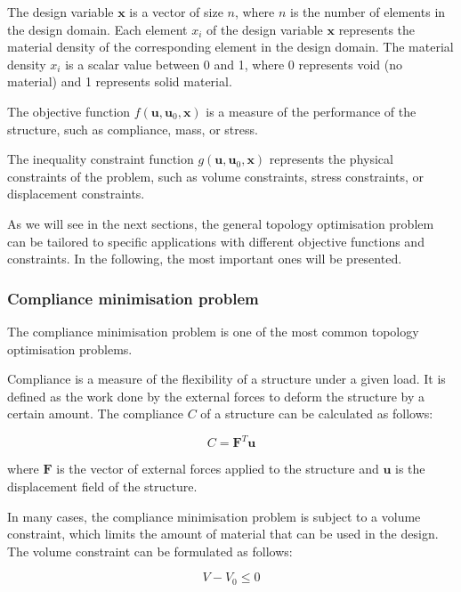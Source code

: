 The design variable $\bm{x}$ is a vector of size $n$, where $n$ is the number of elements in the design domain.
Each element $x_i$ of the design variable $\bm{x}$ represents the material density of the corresponding element in the design domain.
The material density $x_i$ is a scalar value between 0 and 1, where 0 represents void (no material) and 1 represents solid material.

The objective function $f(\bm{u}, \bm{u}_0, \bm{x})$ is a measure of the performance of the structure, such as compliance, mass, or stress.

The inequality constraint function $g(\bm{u}, \bm{u}_0, \bm{x})$ represents the physical constraints of the problem, such as volume constraints, stress constraints, or displacement constraints.

As we will see in the next sections, the general topology optimisation problem can be tailored to specific applications with different objective functions and constraints.
In the following, the most important ones will be presented.


\subsubsection{Compliance minimisation problem}
\label{subsubsec:compliance_minimisation_problem}

The compliance minimisation problem is one of the most common topology optimisation problems.

Compliance is a measure of the flexibility of a structure under a given load.
It is defined as the work done by the external forces to deform the structure by a certain amount.
The compliance $C$ of a structure can be calculated as follows:

\begin{equation}
    C = \bm{F}^T \bm{u}
    \label{eq:compliance}
\end{equation}

where $\bm{F}$ is the vector of external forces applied to the structure and $\bm{u}$ is the displacement field of the structure.

In many cases, the compliance minimisation problem is subject to a volume constraint, which limits the amount of material that can be used in the design.
The volume constraint can be formulated as follows:

\begin{equation}
    V - V_0 \le 0
    \label{eq:volume_constraint}
\end{equation}

